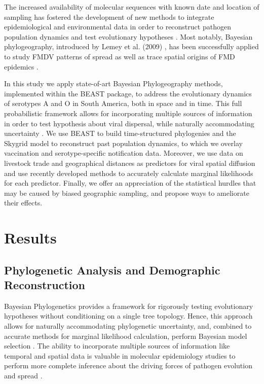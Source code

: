 \documentclass[10pt]{article}
\begin{document}
The increased availability of molecular sequences with known date and location of sampling has fostered the development of new methods to integrate epidemiological and environmental data in order to reconstruct pathogen population dynamics and test evolutionary hypotheses \cite{MEP,grenfell}.
Most notably, Bayesian phylogeography, introduced by Lemey et al. (2009) \cite{roots}, has been successfully applied to study FMDV patterns of spread as well as trace spatial  origins of FMD epidemics \cite{Carvalho2012,bulgaria,phymal}.

In this study we apply state-of-art Bayesian Phylogeography methods, implemented within the BEAST \cite{BEAST} package, to address the evolutionary dynamics of serotypes A and O in South America, both in space and in time.
This full probabilistic framework allows for incorporating multiple sources of information in order to test hypothesis about viral dispersal, while naturally accommodating uncertainty \cite{roots,towards}.
We use BEAST to build time-structured phylogenies and the Skygrid \cite{skygrid} model to reconstruct past population dynamics, to which we overlay vaccination and serotype-specific notification data.
Moreover, we use data on livestock trade and geographical distances as predictors for viral spatial diffusion and use recently developed methods to accurately calculate marginal likelihoods for each predictor.
Finally, we offer an appreciation of the statistical hurdles that may be caused by biased geographic sampling, and propose ways to ameliorate their effects.



\section*{Results}



\subsection*{Phylogenetic Analysis and Demographic Reconstruction}

Bayesian Phylogenetics provides a framework for rigorously testing evolutionary hypotheses without conditioning on a single tree topology.
Hence, this approach allows for naturally accommodating phylogenetic uncertainty, and, combined to accurate methods for marginal likelihood calculation, perform Bayesian model selection \cite{Baele2012,Baele2013a,Baele2013b}.
The ability to incorporate multiple sources of information like temporal and spatial data is valuable in molecular epidemiology studies to perform more complete inference about the driving forces of pathogen evolution and spread \cite{towards,combining,MEP,roots}. 
\end{document}

